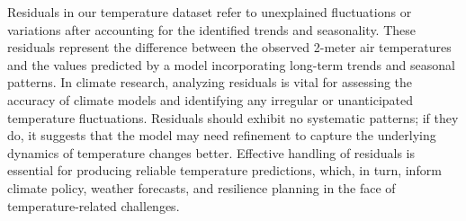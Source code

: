 \documentclass[sn-mathphys,Numbered]{sn-jnl}
\theoremstyle{thmstyleone}
\theoremstyle{thmstyletwo}
\theoremstyle{thmstylethree}
\begin{document}
Residuals in our temperature dataset refer to unexplained fluctuations or variations after accounting for the identified trends and seasonality. These residuals represent the difference between the observed 2-meter air temperatures and the values predicted by a model incorporating long-term trends and seasonal patterns. In climate research, analyzing residuals is vital for assessing the accuracy of climate models and identifying any irregular or unanticipated temperature fluctuations. Residuals should exhibit no systematic patterns; if they do, it suggests that the model may need refinement to capture the underlying dynamics of temperature changes better. Effective handling of residuals is essential for producing reliable temperature predictions, which, in turn, inform climate policy, weather forecasts, and resilience planning in the face of temperature-related challenges.







\end{document}
